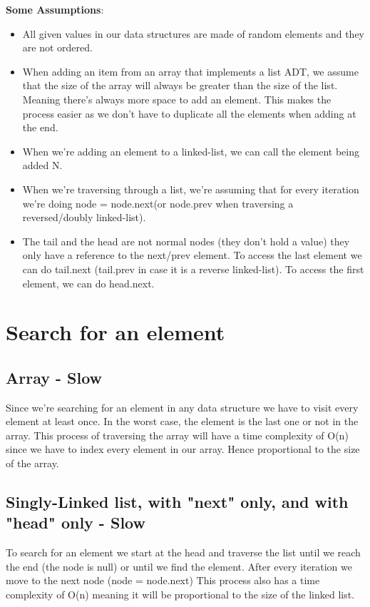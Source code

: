 \documentclass{article}
\begin{document}
\textbf{Some Assumptions}:
\begin{itemize}
    \item All given values in our data structures are made of random elements and they are not ordered.
    \item When adding an item from an array that implements a list ADT, we assume that the size of the array will always be greater than the size of the list. Meaning there's always more space to add an element. This makes the process easier as we don't have to duplicate all the elements when adding at the end.
    \item When we're adding an element to a linked-list, we can call the element being added N.
    \item When we’re traversing through a list, we’re assuming that for every iteration we’re doing node = node.next(or node.prev when traversing a reversed/doubly linked-list).
    \item The tail and the head are not normal nodes (they don't hold a value) they only have a reference to the next/prev element. To access the last element we can do tail.next (tail.prev in case it is a reverse linked-list). To access the first element, we can do head.next.
\end{itemize}



\section{Search for an element}
\subsection{Array - Slow}
Since we're searching for an element in any data structure we have to visit every element at least once. In the worst case, the element is the last one or not in the array. This process of traversing the array will have a time complexity of O(n) since we have to index every element in our array. Hence proportional to the size of the array.

\subsection{Singly-Linked list, with "next" only, and with "head" only - Slow}
To search for an element we start at the head and traverse the list until we reach the end (the node is null) or until we find the element. After every iteration we move to the next node (node = node.next) This process also has a time complexity of O(n) meaning it will be proportional to the size of the linked list.
\end{document}
